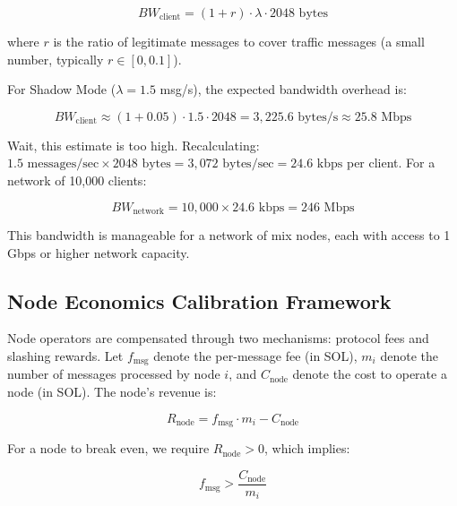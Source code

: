 \documentclass[11pt]{article}
\theoremstyle{definition}
\theoremstyle{remark}
\begin{document}
\begin{equation}
BW_{\text{client}} = (1 + r) \cdot \lambda \cdot 2048 \text{ bytes}
\label{eq:bw-client}
\end{equation}

where $r$ is the ratio of legitimate messages to cover traffic messages (a small number, typically $r \in [0, 0.1]$).

For Shadow Mode ($\lambda = 1.5$ msg/s), the expected bandwidth overhead is:

\begin{equation}
BW_{\text{client}} \approx (1 + 0.05) \cdot 1.5 \cdot 2048 = 3,225.6 \text{ bytes/s} \approx 25.8 \text{ Mbps}
\label{eq:bw-shadow}
\end{equation}

Wait, this estimate is too high. Recalculating: $1.5 \text{ messages/sec} \times 2048 \text{ bytes} = 3,072 \text{ bytes/sec} = 24.6 \text{ kbps}$ per client. For a network of 10,000 clients:

\begin{equation}
BW_{\text{network}} = 10,000 \times 24.6 \text{ kbps} = 246 \text{ Mbps}
\label{eq:bw-network}
\end{equation}

This bandwidth is manageable for a network of mix nodes, each with access to 1 Gbps or higher network capacity.

\subsection{Node Economics Calibration Framework}
\label{subsec:economics}

Node operators are compensated through two mechanisms: protocol fees and slashing rewards. Let $f_{\text{msg}}$ denote the per-message fee (in SOL), $m_i$ denote the number of messages processed by node $i$, and $C_{\text{node}}$ denote the cost to operate a node (in SOL). The node's revenue is:

\begin{equation}
R_{\text{node}} = f_{\text{msg}} \cdot m_i - C_{\text{node}}
\label{eq:node-revenue}
\end{equation}

For a node to break even, we require $R_{\text{node}} > 0$, which implies:

\begin{equation}
f_{\text{msg}} > \frac{C_{\text{node}}}{m_i}
\label{eq:fee-requirement}
\end{equation}
\end{document}
